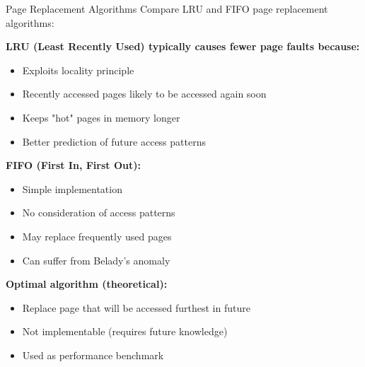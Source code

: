 \begin{example2}{Page Replacement Algorithms}
    Compare LRU and FIFO page replacement algorithms:
    
    \tcblower
    
    \textbf{LRU (Least Recently Used) typically causes fewer page faults because:}
    \begin{itemize}
        \item Exploits locality principle
        \item Recently accessed pages likely to be accessed again soon
        \item Keeps "hot" pages in memory longer
        \item Better prediction of future access patterns
    \end{itemize}
    
    \textbf{FIFO (First In, First Out):}
    \begin{itemize}
        \item Simple implementation
        \item No consideration of access patterns
        \item May replace frequently used pages
        \item Can suffer from Belady's anomaly
    \end{itemize}
    
    \textbf{Optimal algorithm (theoretical):}
    \begin{itemize}
        \item Replace page that will be accessed furthest in future
        \item Not implementable (requires future knowledge)
        \item Used as performance benchmark
    \end{itemize}
\end{example2}

